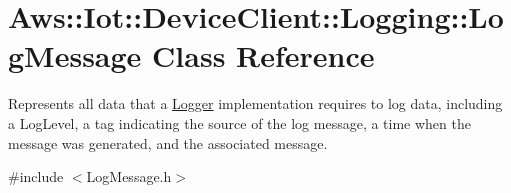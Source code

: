 \hypertarget{class_aws_1_1_iot_1_1_device_client_1_1_logging_1_1_log_message}{}\section{Aws\+:\+:Iot\+:\+:Device\+Client\+:\+:Logging\+:\+:Log\+Message Class Reference}
\label{class_aws_1_1_iot_1_1_device_client_1_1_logging_1_1_log_message}


Represents all data that a \hyperlink{class_aws_1_1_iot_1_1_device_client_1_1_logging_1_1_logger}{Logger} implementation requires to log data, including a Log\+Level, a tag indicating the source of the log message, a time when the message was generated, and the associated message.  




{\ttfamily \#include $<$Log\+Message.\+h$>$}

